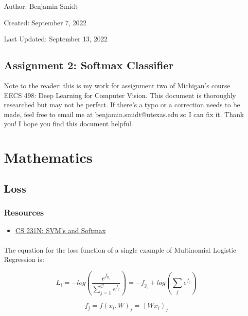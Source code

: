 \documentclass[12pt]{article}
\begin{document}
\noindent Author: Benjamin Smidt

\noindent Created: September 7, 2022

\noindent Last Updated: September 13, 2022
\begin{center}
\section*{Assignment 2: Softmax Classifier}
\end{center}

\noindent Note to the reader: this is my work for assignment two of Michigan's course
EECS 498: Deep Learning for Computer Vision. This document is thoroughly researched but
may not be perfect. If there's a typo or a correction needs to be made, feel free to 
email me at benjamin.smidt@utexas.edu so I can fix it. Thank you! I hope you find this 
document helpful.

\tableofcontents{}

\newpage

\section{Mathematics}
\subsection{Loss}
\subsubsection*{Resources}

\begin{itemize}
    \item \href{https://cs231n.github.io/linear-classify/#svm-vs-softmax}{CS 231N: SVM's and Softmax }
\end{itemize}

\paragraph{}
The equation for the loss function of a single example of 
Multinomial Logistic Regression is:  

\begin{equation}
    L_{i} = -log(\frac{e^{f_{y_{i}}}}{\sum_{j=1}^C e^{f_j}}) 
    = -f_{y_{i}} + log(\sum_{j} e^{f_{j}})
\end{equation}

\begin{equation}
    f_j = f(x_{i}, W)_j = (Wx_{i})_j
\end{equation}
\end{document}
